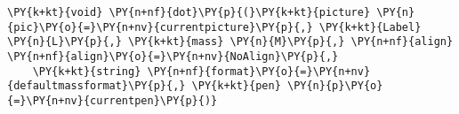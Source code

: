 \begin{Verbatim}[commandchars=\\\{\}]
    \PY{k+kt}{void} \PY{n+nf}{dot}\PY{p}{(}\PY{k+kt}{picture} \PY{n}{pic}\PY{o}{=}\PY{n+nv}{currentpicture}\PY{p}{,} \PY{k+kt}{Label} \PY{n}{L}\PY{p}{,} \PY{k+kt}{mass} \PY{n}{M}\PY{p}{,} \PY{n+nf}{align} \PY{n+nf}{align}\PY{o}{=}\PY{n+nv}{NoAlign}\PY{p}{,}
    \PY{k+kt}{string} \PY{n+nf}{format}\PY{o}{=}\PY{n+nv}{defaultmassformat}\PY{p}{,} \PY{k+kt}{pen} \PY{n}{p}\PY{o}{=}\PY{n+nv}{currentpen}\PY{p}{)}
\end{Verbatim}
